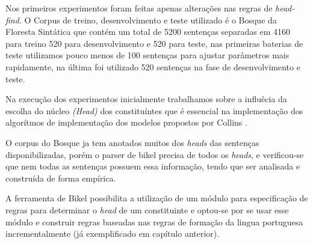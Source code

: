 Nos primeiros experimentos foram feitas apenas alterações nas regras de \emph{head-find}. O Corpus de treino, desenvolvimento e teste utilizado é o Bosque da Floresta Sintática que contém um total de 5200 sentenças separadas em 4160 para treino 520 para desenvolvimento e 520 para teste, nas primeiras baterias de teste utilizamos pouco menos de 100 sentenças para ajustar parâmetros mais rapidamente, na última foi utilizado 520 sentenças na fase de desenvolvimento e teste.

Na execução dos experimentos inicialmente trabalhamos sobre a influêcia da escolha do núcleo \emph{(Head)} dos constituíntes que é essencial na implementação dos algorítmos de implementação dos modelos propostos por Collins \cite{collins99}.

O corpus do Bosque ja tem anotados muitos dos \emph{heads} das sentenças disponibilizadas, porém o parser de bikel precisa de todos os \emph{heads}, e verificou-se que nem todas as sentenças possuem essa informação, tendo que ser analisada e construída de forma empírica.

A ferramenta de Bikel possibilita a utilização de um módulo para especificação de regras para determinar o \emph{head} de um constituinte e optou-se por se usar esse módulo e construir regras baseadas nas regras de formação da lingua portuguesa incrementalmente (já exemplificado em capítulo anterior). 



